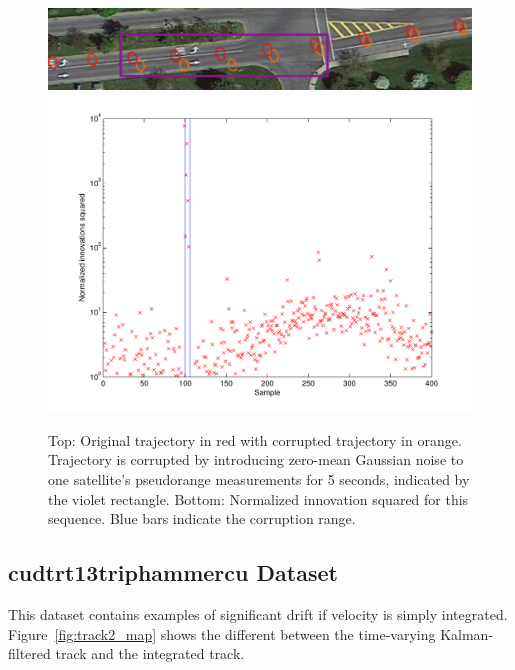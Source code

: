 \begin{figure}[!b]
\includegraphics[width=\columnwidth]{corruption}\\
\includegraphics[width=\columnwidth]{nis_corruption}
\caption{Top: Original trajectory in red with corrupted trajectory in orange.  Trajectory is corrupted by introducing zero-mean Gaussian noise to one satellite's pseudorange measurements for 5 seconds, indicated by the violet rectangle.  Bottom: Normalized innovation squared for this sequence.  Blue bars indicate the corruption range.}
\label{fig:corruption}
\end{figure}

\subsection{cudtrt13triphammercu Dataset}
This dataset contains examples of significant drift if velocity is simply integrated.  Figure~\ref{fig:track2_map} shows the different between the time-varying Kalman-filtered track and the integrated track.

